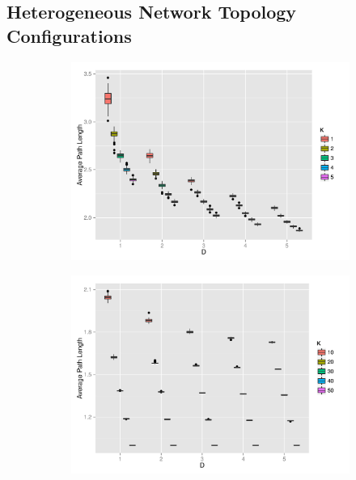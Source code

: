 \subsection{Heterogeneous Network Topology Configurations}
\begin{figure}[H]
\centering
\begin{subfigure}{.49\linewidth}
  \centering
 \includegraphics[width=1\linewidth]{"../analysis/pdf/network_properties_apl_sf_kregular_12345"}
 \caption{}
 \label{append_fig:network_properties_apl_sf_kreg_12345}
\end{subfigure}%
\begin{subfigure}{.49\linewidth}
  \centering
 \includegraphics[width=1\linewidth]{"../analysis/pdf/network_properties_apl_sf_kregular_1020304050"}
 \caption{}
 \label{append_fig:network_properties_apl_sf_kreg_1020304050}
\end{subfigure}


\end{figure}
